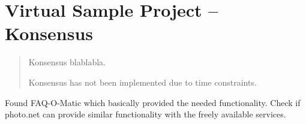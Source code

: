 
\section{Virtual Sample Project -- Konsensus}


\begin{abstract}
  Konsensus blablabla.

  Konsensus has not been implemented due to time constraints.
\end{abstract}


Found FAQ-O-Matic which basically provided the needed functionality.
Check if photo.net can provide similar functionality with the freely
available services.
  
